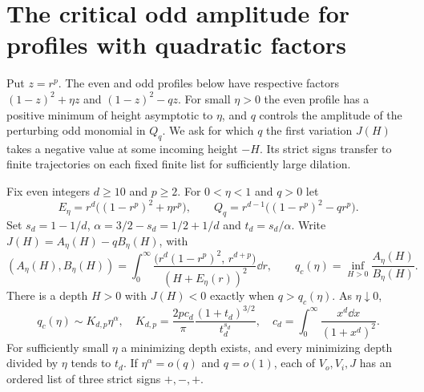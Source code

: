 \section{The critical odd amplitude for profiles with quadratic factors}\label{sec:threshold}
Put $z=r^p$. The even and odd profiles below have respective factors
$(1-z)^2+\eta z$ and $(1-z)^2-qz$. For small $\eta>0$ the even
profile has a positive minimum of height asymptotic to $\eta$, and $q$
controls the amplitude of the perturbing odd monomial in $Q_q$.
We ask for which $q$ the first variation $J(H)$ takes a negative
value at some incoming height $-H$. Its strict signs transfer to finite
trajectories on each fixed finite list for sufficiently large dilation.

\begin{proposition}\label{prop:threshold}
Fix even integers $d\ge10$ and $p\ge2$. For $0<\eta<1$ and $q>0$ let
\begin{equation}\label{eq:test-family}
 E_\eta=r^d\bigl((1-r^p)^2+\eta r^p\bigr),\qquad
 Q_q=r^{d-1}\bigl((1-r^p)^2-q r^p\bigr).
\end{equation}
Set $s_d=1-1/d$, $\alpha=3/2-s_d=1/2+1/d$ and $t_d=s_d/\alpha$.
Write $J(H)=A_\eta(H)-qB_\eta(H)$, with
\[
 (A_\eta(H),B_\eta(H))=
 \int_0^\infty \frac{\bigl(r^d(1-r^p)^2,\,r^{d+p}\bigr)}{(H+E_\eta(r))^2}\dd r,
 \qquad q_c(\eta)=\inf_{H>0}\frac{A_\eta(H)}{B_\eta(H)} .
\]
There is a depth $H>0$ with $J(H)<0$ exactly when $q>q_c(\eta)$.
As $\eta\downarrow0$,
\begin{equation}\label{eq:threshold-asym}
 q_c(\eta)\sim K_{d,p}\eta^\alpha,\quad
 K_{d,p}=\frac{2p c_d}{\pi}\frac{(1+t_d)^{3/2}}{t_d^{s_d}},
 \quad c_d=\int_0^\infty\frac{x^d\dd x}{(1+x^d)^2}.
\end{equation}
For sufficiently small $\eta$ a minimizing depth exists, and every
minimizing depth divided by $\eta$ tends to $t_d$.
If $\eta^\alpha=o(q)$ and $q=o(1)$, each of $V_o,V_i,J$ has an ordered
list of three strict signs $+,-,+$.
\end{proposition}

